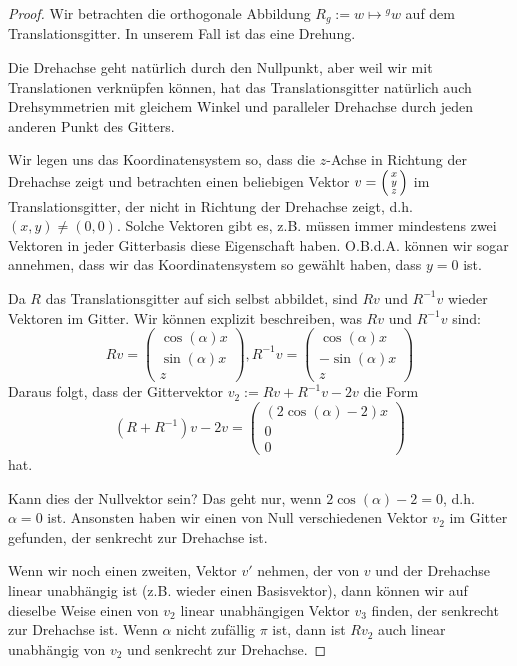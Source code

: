 \begin{proof}
Wir betrachten die orthogonale Abbildung $R_g:=w\mapsto{^g w}$ auf dem Translationsgitter. In unserem Fall ist das eine Drehung.

Die Drehachse geht natürlich durch den Nullpunkt, aber weil wir mit Translationen verknüpfen können, hat das Translationsgitter natürlich auch Drehsymmetrien mit gleichem Winkel und paralleler Drehachse durch jeden anderen Punkt des Gitters.

Wir legen uns das Koordinatensystem so, dass die $z$-Achse in Richtung der Drehachse zeigt und betrachten einen beliebigen Vektor $v=\begin{psmallmatrix}x\\y\\z\end{psmallmatrix}$ im Translationsgitter, der nicht in Richtung der Drehachse zeigt, d.h. $(x,y)\neq(0,0)$. Solche Vektoren gibt es, z.B. müssen immer mindestens zwei Vektoren in jeder Gitterbasis diese Eigenschaft haben. O.B.d.A. können wir sogar annehmen, dass wir das Koordinatensystem so gewählt haben, dass $y=0$ ist.

\medbreak
Da $R$ das Translationsgitter auf sich selbst abbildet, sind $Rv$ und $R^{-1}v$ wieder Vektoren im Gitter. Wir können explizit beschreiben, was $Rv$ und $R^{-1}v$ sind:
\[Rv =\begin{pmatrix}\cos(\alpha)x\\\sin(\alpha)x\\z\end{pmatrix}, R^{-1}v =\begin{pmatrix}\cos(\alpha)x\\-\sin(\alpha)x\\z\end{pmatrix}\]
Daraus folgt, dass der Gittervektor $v_2:=Rv+R^{-1}v-2v$ die Form
\[(R+R^{-1})v-2v = \begin{pmatrix}(2\cos(\alpha)-2)x\\0\\0\end{pmatrix}\]
hat.

Kann dies der Nullvektor sein? Das geht nur, wenn $2\cos(\alpha)-2=0$, d.h. $\alpha=0$ ist. Ansonsten haben wir einen von Null verschiedenen Vektor $v_2$ im Gitter gefunden, der senkrecht zur Drehachse ist.

Wenn wir noch einen zweiten, Vektor $v'$ nehmen, der von $v$ und der Drehachse linear unabhängig ist (z.B. wieder einen Basisvektor), dann können wir auf dieselbe Weise einen von $v_2$ linear unabhängigen Vektor $v_3$ finden, der senkrecht zur Drehachse ist. Wenn $\alpha$ nicht zufällig $\pi$ ist, dann ist $Rv_2$ auch linear unabhängig von $v_2$ und senkrecht zur Drehachse.


\end{proof}
